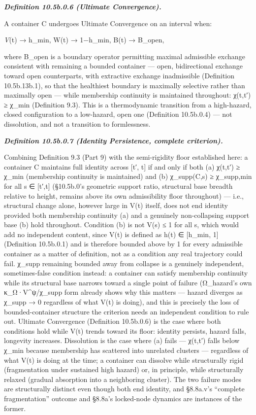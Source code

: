 \documentclass[
]{article}
\begin{document}
\emph{\textbf{Definition 10.5b.0.6 (Ultimate Convergence).}}

A container C undergoes Ultimate Convergence on an interval when:

\emph{V}(t) → h\_min, W(t) → 1−h\_min, B(t) → B\_open,

where B\_open is a boundary operator permitting maximal admissible
exchange consistent with remaining a bounded container --- open,
bidirectional exchange toward open counterparts, with extractive
exchange inadmissible (Definition 10.5b.13b.1), so that the healthiest
boundary is maximally selective rather than maximally open --- while
membership continuity is maintained throughout: χ(t,t′) ≥ χ\_min
(Definition 9.3). This is a thermodynamic transition from a high-hazard,
closed configuration to a low-hazard, open one (Definition 10.5b.0.4)
--- not dissolution, and not a transition to formlessness.

\emph{\textbf{Definition 10.5b.0.7 (Identity Persistence, complete
criterion).}}

Combining Definition 9.3 (Part 9) with the semi-rigidity floor
established here: a container C maintains full identity across {[}t′,
t{]} if and only if both (a) χ(t,t′) ≥ χ\_min (membership continuity is
maintained) and (b) χ\_supp(C,s) ≥ χ\_supp,min for all s ∈ {[}t′,t{]}
(§10.5b.0's geometric support ratio, structural base breadth relative to
height, remains above its own admissibility floor throughout) --- i.e.,
structural change alone, however large in V(t) itself, does not end
identity provided both membership continuity (a) and a genuinely
non-collapsing support base (b) hold throughout. Condition (b) is not
V(s) ≤ 1 for all s, which would add no independent content, since V(t)
is defined as h(t) ∈ {[}h\_min, 1{]} (Definition 10.5b.0.1) and is
therefore bounded above by 1 for every admissible container as a matter
of definition, not as a condition any real trajectory could fail.
χ\_supp remaining bounded away from collapse is a genuinely independent,
sometimes-false condition instead: a container can satisfy membership
continuity while its structural base narrows toward a single point of
failure (Ω\_hazard's own κ\_Ω·V\^{}ψ/χ\_supp form already shows why this
matters --- hazard diverges as χ\_supp → 0 regardless of what V(t) is
doing), and this is precisely the loss of bounded-container structure
the criterion needs an independent condition to rule out. Ultimate
Convergence (Definition 10.5b.0.6) is the case where both conditions
hold while V(t) trends toward its floor: identity persists, hazard
falls, longevity increases. Dissolution is the case where (a) fails ---
χ(t,t′) falls below χ\_min because membership has scattered into
unrelated clusters --- regardless of what V(t) is doing at the time; a
container can dissolve while structurally rigid (fragmentation under
sustained high hazard) or, in principle, while structurally relaxed
(gradual absorption into a neighboring cluster). The two failure modes
are structurally distinct even though both end identity, and §8.8a.v's
``complete fragmentation'' outcome and §8.8a's locked-node dynamics are
instances of the former.
\end{document}
